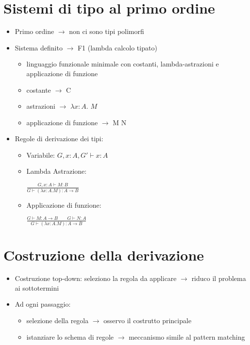 \documentclass[12pt]{extarticle}
\begin{document}
\section*{Sistemi di tipo al primo ordine}
\begin{itemize}
  \item Primo ordine $\rightarrow$ non ci sono tipi polimorfi
  \item Sistema definito $\rightarrow$ F1 (lambda calcolo tipato)
  \begin{itemize}
    \item linguaggio funzionale minimale con costanti, lambda-astrazioni e applicazione di funzione
    \item costante $\rightarrow$ C
    \item astrazioni $\rightarrow$ $\lambda x:A.$ $M$
    \item applicazione di funzione $\rightarrow$ M N
  \end{itemize}
  \item Regole di derivazione dei tipi:
  \begin{itemize}
    \item Variabile: $G, x:A, G' \vdash x:A$
    \item Lambda Astrazione: 
    \begin{flushleft}
    \hspace*{7em}
    \(
        \displaystyle
        \frac
        {G, x:A \vdash M:B}
        {G \vdash (\lambda x:A. M) : A \rightarrow B }
    \)
  \end{flushleft}
  \item Applicazione di funzione:
  \begin{flushleft}
   \hspace*{7em}
    \(
        \displaystyle
        \frac
        {G \vdash M : A \rightarrow B \qquad G \vdash N:A}
        {G \vdash (\lambda x:A. M) : A \rightarrow B }
    \)
  \end{flushleft}
  \end{itemize}
\end{itemize}

\section*{Costruzione della derivazione}
\begin{itemize}
  \item Costruzione top-down: seleziono la regola da applicare $\rightarrow$ riduco il problema ai sottotermini
  \item Ad ogni passaggio:
  \begin{itemize}
    \item selezione della regola $\rightarrow$ osservo il costrutto principale
    \item istanziare lo schema di regole $\rightarrow$ meccanismo simile al pattern matching
  \end{itemize}
\end{itemize}
\end{document}
